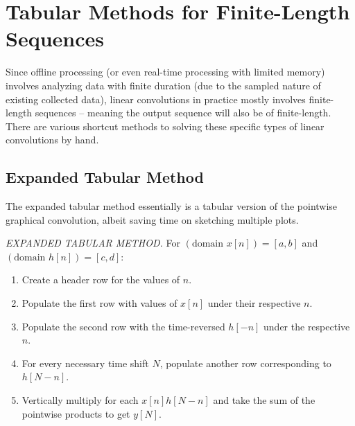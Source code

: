 \documentclass{report}
\begin{document}
\section{Tabular Methods for Finite-Length Sequences}
Since offline processing (or even real-time processing with limited memory) involves analyzing data with finite duration (due to the sampled nature of existing collected data), linear convolutions in practice 
mostly involves finite-length sequences -- meaning the output sequence will also be of finite-length. There are various shortcut methods to solving 
these specific types of linear convolutions by hand.

\subsection{Expanded Tabular Method}
The expanded tabular method essentially is a tabular version of the pointwise graphical convolution, albeit saving time on sketching multiple plots.

\begin{tcolorbox}[width=\textwidth,colback={white}, sharp corners]
    \noindent\emph{EXPANDED TABULAR METHOD.} For $(\text{domain } x[n]) = [a,b]$ and $(\text{domain } h[n]) = [c,d]$:
    \begin{enumerate}[Step 1:]
        \item Create a header row for the values of $n$.
        \item Populate the first row with values of $x[n]$ under their respective $n$.
        \item Populate the second row with the time-reversed $h[-n]$ under the respective $n$.
        \item For every necessary time shift $N$, populate another row corresponding to $h[N-n]$.
        \item Vertically multiply for each $x[n]h[N-n]$ and take the sum of the pointwise products to get $y[N]$.
    \end{enumerate}
\end{tcolorbox}
\end{document}
